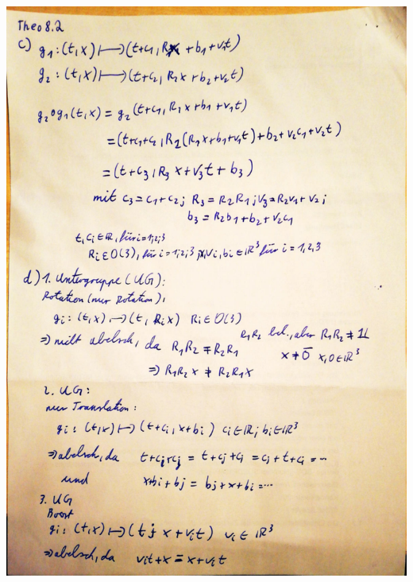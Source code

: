 \documentclass{theozettel}
\begin{document}
\begin{center}
\includegraphics[width=14cm]{PTP8-2)_2.pdf}
\end{center}
\newpage
\end{document}
